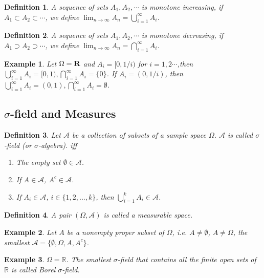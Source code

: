 \documentclass[11pt]{article}
\def\R{{\bf R}}
\def\MA{{\mathcal A}}
\def\BR{{\mathbb R}}
\newtheorem{definition}{Definition}[section]
\newtheorem{example}{Example}[section]
\begin{document}
\begin{definition}
A sequence of sets $A_1, A_2, \cdots$ is \emph{monotone increasing},
if $A_1 \subset A_2 \subset \cdots$, we define $\displaystyle\lim_{n\rightarrow \infty} A_n = \bigcup_{i = 1}^{\infty}A_i$.
\end{definition}

\begin{definition}
A sequence of sets $A_1, A_2, \cdots$ is \emph{monotone decreasing},
if $A_1 \supset A_2 \supset \cdots$, we define $\displaystyle\lim_{n\rightarrow \infty} A_n = \bigcap_{i = 1}^{\infty}A_i$.
\end{definition}

\begin{example}
Let $\Omega = \R$ and $A_i = [0, 1/i)$ for $i = 1, 2\cdots$,then \\
$\displaystyle \bigcup_{i = 1}^{\infty}A_i = [0, 1), \displaystyle \bigcap_{i = 1}^{\infty}A_i = \{0\}$.
If $A_i = (0, 1/i)$, then $\displaystyle \bigcup_{i = 1}^{\infty}A_i = (0, 1), \displaystyle \bigcap_{i = 1}^{\infty}A_i = \emptyset$.
\end{example}

\subsection{$\sigma$-field and Measures}
\begin{definition}
Let $\MA$ be a collection of subsets of a sample space $\Omega$. $\MA$ is called $\sigma$-field (or $\sigma$-algebra).
iff
\begin{enumerate}
\item The empty set $\emptyset \in \MA$.
\item If $A \in \MA$, $A^c \in \MA$.
\item If $A_i \in \MA$, $i \in \{1,2, ..., k\}$, then $\displaystyle\bigcup_{i=1}^k A_i \in \MA$.
\end{enumerate}
\end{definition}

\begin{definition}
A pair $(\Omega, \MA)$ is called a measurable space.
\end{definition}

\begin{example}
Let $A$ be a nonempty proper subset of $\Omega$, i.e. $A \neq \emptyset$, $A\neq \Omega$,
the smallest $\MA = \{\emptyset, \Omega, A, A^c\}$.
\end{example}

\begin{example}
$\Omega = \BR$. The smallest $\sigma$-field that contains all the finite open sets of $\BR$  is called Borel $\sigma$-field.
\end{example}
\end{document}
